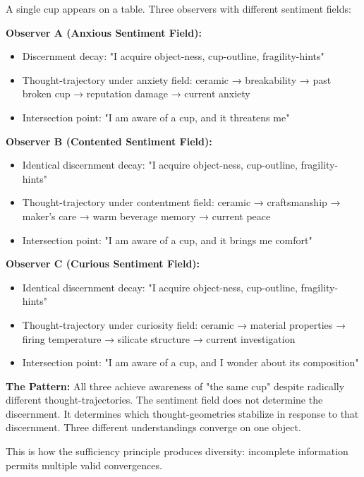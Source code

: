 \begin{example}
\label{ex:cup-three-sentiments}
A single cup appears on a table. Three observers with different sentiment fields:

\textbf{Observer A (Anxious Sentiment Field):}
\begin{itemize}
\item Discernment decay: "I acquire object-ness, cup-outline, fragility-hints"
\item Thought-trajectory under anxiety field: ceramic → breakability → past broken cup → reputation damage → current anxiety
\item Intersection point: "I am aware of a cup, and it threatens me"
\end{itemize}

\textbf{Observer B (Contented Sentiment Field):}
\begin{itemize}
\item Identical discernment decay: "I acquire object-ness, cup-outline, fragility-hints"
\item Thought-trajectory under contentment field: ceramic → craftsmanship → maker's care → warm beverage memory → current peace
\item Intersection point: "I am aware of a cup, and it brings me comfort"
\end{itemize}

\textbf{Observer C (Curious Sentiment Field):}
\begin{itemize}
\item Identical discernment decay: "I acquire object-ness, cup-outline, fragility-hints"
\item Thought-trajectory under curiosity field: ceramic → material properties → firing temperature → silicate structure → current investigation
\item Intersection point: "I am aware of a cup, and I wonder about its composition"
\end{itemize}

\textbf{The Pattern:}
All three achieve awareness of "the same cup" despite radically different thought-trajectories. The sentiment field does not determine the discernment. It determines which thought-geometries stabilize in response to that discernment. Three different understandings converge on one object.

This is how the sufficiency principle produces diversity: incomplete information permits multiple valid convergences.
\end{example}

